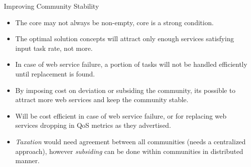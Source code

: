 \documentclass{beamer}
\begin{document}
\begin{frame}{Improving Community Stability}
    \begin{itemize}
        \item The core may not always be non-empty, core is a strong condition.
        \item The optimal solution concepts will attract only enough services satisfying input task rate, not more.
        \item In case of web service failure, a portion of tasks will not be handled efficiently until replacement is found.
        \item By imposing cost on deviation or subsiding the community, its possible to attract more web services and keep the community stable.
        \item Will be cost efficient in case of web service failure, or for replacing web services dropping in QoS metrics as they advertised.
        \item \emph{Taxation} would need agreement between all communities (needs a centralized approach), however \emph{subsiding} can be done within communities in distributed manner.
    \end{itemize}
\end{frame}
\end{document}
